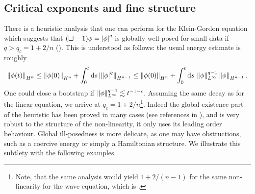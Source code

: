 \documentclass[11pt, oneside]{amsart}
\begin{document}
	\subsection{Critical exponents and fine structure}\label{fine structures in non-linearities}	
	 There is a heuristic analysis that one can perform for the Klein-Gordon equation which suggests that $(\Box-1)\phi=\left\lvert \phi\right\rvert^q$ is globally well-posed for small data if $q>q_c=1+2/n$ (\cite{keel_small_1999}). This is understood as follows: the usual energy estimate is roughly
	\begin{equation*}
		\begin{gathered}
			\left\lVert \phi(t)\right\rVert_{H^{n}}\leq\left\lVert \phi(0)\right\rVert_{H^n}+\int_0^t\mathrm{d} s \left\lVert \left\lvert \phi\right\rvert^q\right\rVert_{H^{n-1}}\leq\left\lVert \phi(0)\right\rVert_{H^n}+\int_0^t\mathrm{d} s\, \left\lVert \phi\right\rVert_{L^\infty}^{q-1}\left\lVert \phi\right\rVert_{H^{n-1}}.
		\end{gathered}
	\end{equation*}
	One could close a bootstrap if $\left\lVert \phi\right\rVert_{L^\infty}^{q-1}\lesssim t^{-1-\epsilon}$. Assuming the same decay as for the linear equation, we arrive at $q_c=1+2/n$\footnote{Note, that the same analysis would yield $1+2/(n-1)$ for the same non-linearity for the wave equation, which is .}. Indeed the global existence part of the heuristic has been proved in many cases (see references in \cite{keel_small_1999}), and is very robust to the structure of the non-linearity, it only uses its leading order behaviour. Global ill-posedness is more delicate, as one may have obstructions, such as a coercive energy or simply a Hamiltonian structure. We illustrate this subtlety with the following examples.
\end{document}
